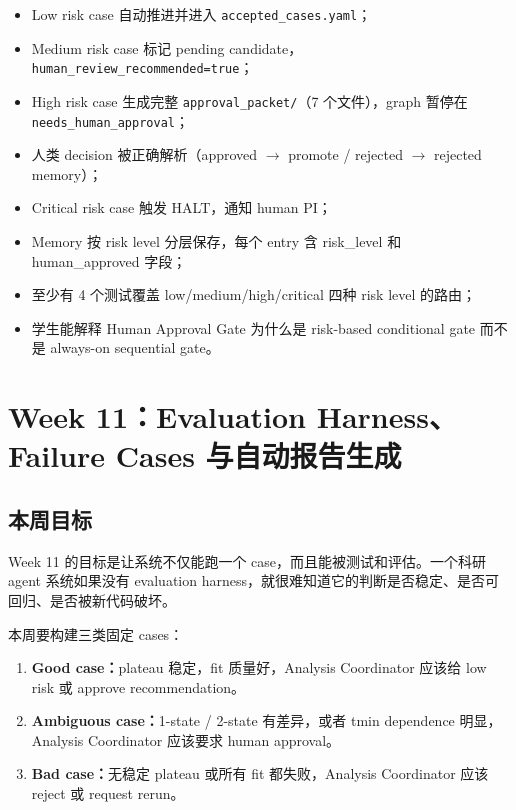 \documentclass[11pt,a4paper,fontset=none]{ctexart}
\begin{document}
\begin{itemize}[leftmargin=2em]
  \item Low risk case 自动推进并进入 \texttt{accepted\_cases.yaml}；
  \item Medium risk case 标记 pending candidate，\texttt{human\_review\_recommended=true}；
  \item High risk case 生成完整 \texttt{approval\_packet/}（7 个文件），graph 暂停在 \texttt{needs\_human\_approval}；
  \item 人类 decision 被正确解析（approved $\to$ promote / rejected $\to$ rejected memory）；
  \item Critical risk case 触发 HALT，通知 human PI；
  \item Memory 按 risk level 分层保存，每个 entry 含 risk\_level 和 human\_approved 字段；
  \item 至少有 4 个测试覆盖 low/medium/high/critical 四种 risk level 的路由；
  \item 学生能解释 Human Approval Gate 为什么是 risk-based conditional gate 而不是 always-on sequential gate。
\end{itemize}


\section{Week 11：Evaluation Harness、Failure Cases 与自动报告生成}

\subsection{本周目标}

Week 11 的目标是让系统不仅能跑一个 case，而且能被测试和评估。一个科研 agent 系统如果没有 evaluation harness，就很难知道它的判断是否稳定、是否可回归、是否被新代码破坏。

本周要构建三类固定 cases：

\begin{enumerate}[leftmargin=2em]
  \item \textbf{Good case：}plateau 稳定，fit 质量好，Analysis Coordinator 应该给 low risk 或 approve recommendation。
  \item \textbf{Ambiguous case：}1-state / 2-state 有差异，或者 tmin dependence 明显，Analysis Coordinator 应该要求 human approval。
  \item \textbf{Bad case：}无稳定 plateau 或所有 fit 都失败，Analysis Coordinator 应该 reject 或 request rerun。
\end{enumerate}
\end{document}
